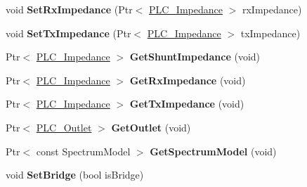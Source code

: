 \begin{DoxyCompactItemize}
\item 
\hypertarget{classns3_1_1PLC__NetDevice_a02261dd5a98019f29b9ae41d38af8e6f}{void {\bfseries \-Set\-Rx\-Impedance} (\-Ptr$<$ \hyperlink{classns3_1_1PLC__ValueBase}{\-P\-L\-C\-\_\-\-Impedance} $>$ rx\-Impedance)}\label{classns3_1_1PLC__NetDevice_a02261dd5a98019f29b9ae41d38af8e6f}

\item 
\hypertarget{classns3_1_1PLC__NetDevice_aadb5e376ec915d39d8e9dee0542f5d7c}{void {\bfseries \-Set\-Tx\-Impedance} (\-Ptr$<$ \hyperlink{classns3_1_1PLC__ValueBase}{\-P\-L\-C\-\_\-\-Impedance} $>$ tx\-Impedance)}\label{classns3_1_1PLC__NetDevice_aadb5e376ec915d39d8e9dee0542f5d7c}

\item 
\hypertarget{classns3_1_1PLC__NetDevice_a7dd8f090ad4ab15d19076fde6e21d3de}{\-Ptr$<$ \hyperlink{classns3_1_1PLC__ValueBase}{\-P\-L\-C\-\_\-\-Impedance} $>$ {\bfseries \-Get\-Shunt\-Impedance} (void)}\label{classns3_1_1PLC__NetDevice_a7dd8f090ad4ab15d19076fde6e21d3de}

\item 
\hypertarget{classns3_1_1PLC__NetDevice_a2ba13f286709decb44130dc3e0be0564}{\-Ptr$<$ \hyperlink{classns3_1_1PLC__ValueBase}{\-P\-L\-C\-\_\-\-Impedance} $>$ {\bfseries \-Get\-Rx\-Impedance} (void)}\label{classns3_1_1PLC__NetDevice_a2ba13f286709decb44130dc3e0be0564}

\item 
\hypertarget{classns3_1_1PLC__NetDevice_a99a4bbd1d5b009af82bd4b869fa2fa2e}{\-Ptr$<$ \hyperlink{classns3_1_1PLC__ValueBase}{\-P\-L\-C\-\_\-\-Impedance} $>$ {\bfseries \-Get\-Tx\-Impedance} (void)}\label{classns3_1_1PLC__NetDevice_a99a4bbd1d5b009af82bd4b869fa2fa2e}

\item 
\hypertarget{classns3_1_1PLC__NetDevice_a83980ae9391fc45136fb972e01992ab5}{\-Ptr$<$ \hyperlink{classns3_1_1PLC__Outlet}{\-P\-L\-C\-\_\-\-Outlet} $>$ {\bfseries \-Get\-Outlet} (void)}\label{classns3_1_1PLC__NetDevice_a83980ae9391fc45136fb972e01992ab5}

\item 
\hypertarget{classns3_1_1PLC__NetDevice_ae5124a3ee442a40efa82217f6f4faf4e}{\-Ptr$<$ const \-Spectrum\-Model $>$ {\bfseries \-Get\-Spectrum\-Model} (void)}\label{classns3_1_1PLC__NetDevice_ae5124a3ee442a40efa82217f6f4faf4e}

\item 
\hypertarget{classns3_1_1PLC__NetDevice_a63e563208c55ad39784c31975d5ec4c9}{void {\bfseries \-Set\-Bridge} (bool is\-Bridge)}\label{classns3_1_1PLC__NetDevice_a63e563208c55ad39784c31975d5ec4c9}


\end{DoxyCompactItemize}
